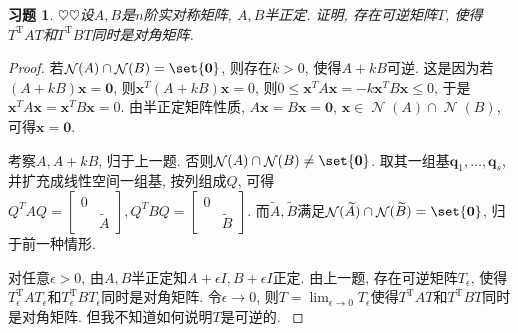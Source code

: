 \documentclass{ctexart}
\newtheorem{exercise}[thm]{习题}
\newcommand\bs[1]{\boldsymbol{ #1}}
\def\hard{$\heartsuit$}
\def\wtd{\widetilde}
\DeclareMathOperator{\T}{T}
\DeclareMathOperator{\nullspace}{\mathcal{N}}
\begin{document}
\begin{exercise}
\hard\hard  设$A, B$是$n$阶实对称矩阵, $A,B$半正定. 
证明, 存在可逆矩阵$T$, 使得$T^{\T}AT$和$T^{\T}BT$同时是对角矩阵. 

\end{exercise}
\begin{proof}
	若$\nullspace(A)\cap\nullspace(B)=\set{\bs 0}$, 则存在$k>0$, 使得$A+kB$可逆. 
	这是因为若$(A+kB)\bs x=\bs 0$, 则$\bs x^T(A+kB)\bs x=0$, 则$0\le \bs x^TA\bs x=-k \bs x^TB\bs x\le 0$, 于是$\bs x^TA\bs x=\bs x^TB\bs x=0$. 
	由半正定矩阵性质, $A\bs x=B\bs x=\bs 0$, $\bs x\in \nullspace(A)\cap\nullspace(B)$, 可得$\bs x=\bs 0$. 

	考察$A,A+kB$, 归于上一题. 
	否则$\nullspace(A)\cap\nullspace(B)\ne\set{\bs 0}$. 
	取其一组基$\bs q_1,\dots,\bs q_s$, 并扩充成线性空间一组基, 按列组成$Q$, 可得$Q^TAQ=\begin{bmatrix}
		0 &\\ & \wtd A
	\end{bmatrix},Q^TBQ=\begin{bmatrix}
	0 & \\ & \wtd B
	\end{bmatrix}$. 而$\wtd A,\wtd B$满足$\nullspace(\wtd A)\cap\nullspace(\wtd B)=\set{\bs 0}$, 归于前一种情形. 

    {\color{blue}对任意$\epsilon>0$, 由$A,B$半正定知$A+\epsilon I,B+\epsilon I$正定. 由上一题, 存在可逆矩阵$T_\epsilon$, 使得$T_\epsilon^{\mathrm{T}}AT_\epsilon$和$T_\epsilon^{\mathrm{T}}B T_\epsilon$同时是对角矩阵. 令$\epsilon\rightarrow 0$, 则$T=\lim_{\epsilon\rightarrow 0}T_\epsilon$使得$T^{\T}AT$和$T^{\T}BT$同时是对角矩阵. 但我不知道如何说明$T$是可逆的. }
\end{proof}
\end{document}
